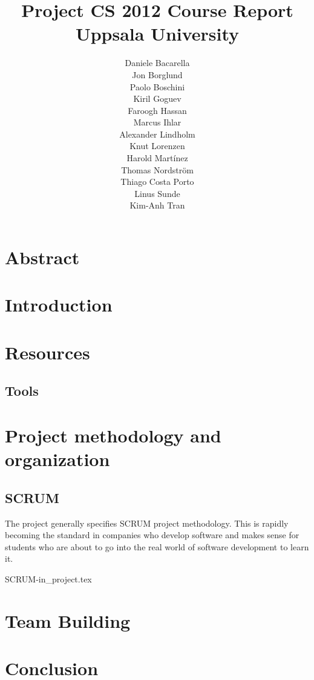 \documentclass[11pt]{report}
\title{Project CS 2012 Course Report\\Uppsala University\\}
\author{Daniele Bacarella\\
Jon Borglund\\
Paolo Boschini\\
Kiril Goguev\\
		Faroogh Hassan\\
		Marcus Ihlar\\
		Alexander Lindholm\\
		Knut Lorenzen\\
		Harold Mart\'{i}nez\\
		Thomas Nordstr\"om\\
		Thiago Costa Porto\\
		Linus Sunde\\
		Kim-Anh Tran
}
\date{}
\begin{document}
\maketitle

\tableofcontents

\chapter{Abstract}


\chapter{Introduction}

\chapter{Resources}




\section{Tools}




\chapter{Project methodology and organization}
\section{SCRUM}

The project generally specifies SCRUM project methodology. This is rapidly becoming the standard in companies who develop software and makes sense for students who are about to go into the real world of software development to learn it.





 {SCRUM-in_project.tex}


\chapter{Team Building}

\chapter{Conclusion}

\end{document}
